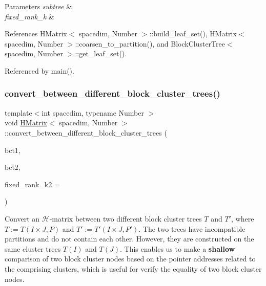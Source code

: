 \begin{DoxyParams}{Parameters}
{\em subtree} & \\
\hline
{\em fixed\+\_\+rank\+\_\+k} & \\
\hline
\end{DoxyParams}


References H\+Matrix$<$ spacedim, Number $>$\+::build\+\_\+leaf\+\_\+set(), H\+Matrix$<$ spacedim, Number $>$\+::coarsen\+\_\+to\+\_\+partition(), and Block\+Cluster\+Tree$<$ spacedim, Number $>$\+::get\+\_\+leaf\+\_\+set().



Referenced by main().

\mbox{\label{classHMatrix_af6fd60090b0de7bdea52fc84ddeb22c3}} 
\subsubsection{\texorpdfstring{convert\+\_\+between\+\_\+different\+\_\+block\+\_\+cluster\+\_\+trees()}{convert\_between\_different\_block\_cluster\_trees()}}
{\footnotesize\ttfamily template$<$int spacedim, typename Number $>$ \\
void \hyperlink{classHMatrix}{H\+Matrix}$<$ spacedim, Number $>$\+::convert\+\_\+between\+\_\+different\+\_\+block\+\_\+cluster\+\_\+trees (\begin{DoxyParamCaption}\item[{\hyperlink{classBlockClusterTree}{Block\+Cluster\+Tree}$<$ spacedim, Number $>$ \&}]{bct1,  }\item[{\hyperlink{classBlockClusterTree}{Block\+Cluster\+Tree}$<$ spacedim, Number $>$ \&}]{bct2,  }\item[{const unsigned int}]{fixed\+\_\+rank\+\_\+k2 = {} }\end{DoxyParamCaption})}

Convert an $\mathcal{H}$-\/matrix between two different block cluster trees $T$ and $T'$, where $T := T(I \times J, P)$ and $T' := T'(I \times J, P')$. The two trees have incompatible partitions and do not contain each other. However, they are constructed on the same cluster trees $T(I)$ and $T(J)$. This enables us to make a {\bfseries shallow} comparison of two block cluster nodes based on the pointer addresses related to the comprising clusters, which is useful for verify the equality of two block cluster nodes.

